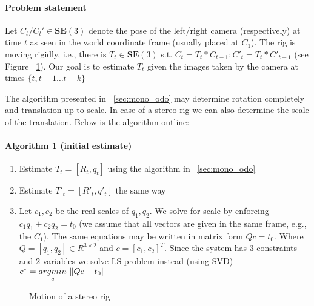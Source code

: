 \documentclass[10pt]{article}         %
\DeclarePairedDelimiter\norm{\lVert}{\rVert}%
\begin{document}
\paragraph{Problem statement} Let $C_t/C_t' \in \mathbf{SE}(3) $
denote the pose of the left/right camera (respectively) at time $t$ as
seen in the world coordinate frame (usually placed at $C_1$). The rig is
moving rigidly, i.e., there is $T_t \in \mathbf{SE}(3)$ s.t. $ C_t =
T_t*C_{t-1}; C'_t = T_t*C'_{t-1}$ (see Figure ~\ref{fig:stereo_rig}).
Our goal is to estimate $T_t$ given the images taken by the camera at
times $\{t,t-1 \ldots t-k\}$

The algorithm presented in ~\ref{sec:mono_odo} may determine
rotation completely and translation up to scale.  In case of a stereo
rig we can also determine the scale of the translation.  Below is the
algorithm outline:

\paragraph{Algorithm 1 (initial estimate)}
\begin{enumerate}
\item Estimate $T_t=[R_t,q_t]$ using the algorithm in ~\ref{sec:mono_odo}
\item Estimate $T'_t=[R'_t,q'_t]$ the same way
\item Let $c_1,c_2$ be the real scales of $q_1,q_2$. We solve for
  scale by enforcing $c_1q_1+c_2q_2 = t_0$ (we assume that all vectors
  are given in the same frame, e.g., the $C_1$).  The same equations
  may be written in matrix form $Qc=t_0$.  Where $Q = [q_1, q_2] \in
  R^{3\times2}$ and $c=[c_1,c_2]^T$.  Since the system has 3
  constraints and 2 variables we solve LS problem instead (using SVD)
  $c^* = \underset{c}{argmin}\ \norm{Qc-t_0}$
\end{enumerate}

\begin{figure}[!h]
  \centering
  \caption{Motion of a stereo rig}
  \label{fig:stereo_rig}
\end{figure}
\end{document}

